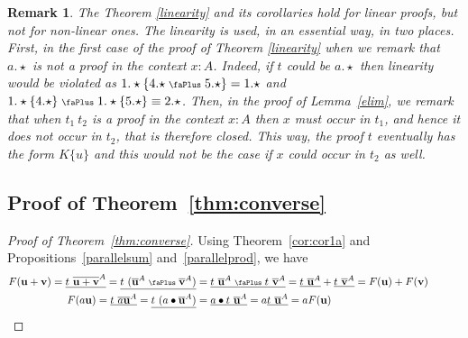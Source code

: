\documentclass[screen, sigconf,authorversion,nonacm]{acmart}
\theoremstyle{acmdefinition}
\newtheorem{remark}[theorem]{Remark}}
\numberwithin{equation}{section}
\newcommand\plus{\mathrel{\text{\normalfont\scalebox{0.7}{\faPlus}}}}
\begin{document}
\begin{remark} The Theorem \ref{linearity} and its
  corollaries hold for linear proofs, but not for non-linear ones. The
  linearity is used, in an essential way, in two places. First, in the first
  case of the proof of Theorem \ref{linearity} when we
  remark that $a.\star$ is not a proof in the context $x:A$. Indeed, if $t$
  could be $a.\star$ then linearity would be violated as $1.\star\{4.\star
  \plus 5.\star\} = 1.\star$ and $1.\star\{4.\star\} \plus 1.\star\{5.\star\}
  \equiv 2.\star$.  Then, in the proof of
  Lemma~\ref{elim}, we remark that when
  $t_1~t_2$ is a proof in the context $x:A$ then $x$ must occur in $t_1$, and
  hence it does not occur in $t_2$, that is therefore closed. This way, the
  proof $t$ eventually has the form $K\{u\}$ and this would not be the case if
  $x$ could occur in $t_2$ as well.
\end{remark}

\subsection{Proof of Theorem~\ref{thm:converse}}
\begin{proof}[Proof of Theorem~\ref{thm:converse}]
  Using Theorem~\ref{cor:cor1a} and Propositions~\ref{parallelsum}
  and~\ref{parallelprod}, we have
  \begin{align*}
    F({\bf u} + {\bf v}) = \underline{t~\overline{\bf u + \bf v}^A}
    = \underline{t~(\overline{\bf u}^A \plus \overline{\bf v}^A)}
    & =
    \underline{t~\overline{\bf u}^A \plus t~\overline{\bf v}^A}
    =
    \underline{t~\overline{\bf u}^A} +
    \underline{t~\overline{\bf v}^A} =
    F({\bf u}) + F({\bf v})
    \\
    F(a {\bf u}) = \underline{t~\overline{a \bf u}^A}
    = \underline{t~(a \bullet \overline{\bf u}^A)} 
    & =
    \underline{a\bullet t~\overline{\bf u}^A}
    = a \underline{t~\overline{\bf u}^A} = a F({\bf u})
    &\tag*{\qedhere}
  \end{align*}
\end{proof}
\end{document}
